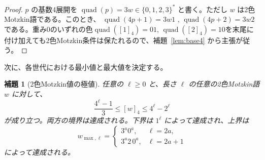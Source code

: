 \documentclass[12pt]{ltjsarticle}
\theoremstyle{plain}
\newtheorem{lemma}[theorem]{補題}
\theoremstyle{definition}
\theoremstyle{plain}
\begin{document}
\begin{proof}
$p$ の基数4展開を $\operatorname{quad}(p)=3w\in\{0,1,2,3\}^*$ と書く。ただし $w$ は2色Motzkin語である。このとき、 $\operatorname{quad}(4p+1)=3w1$ ,  $\operatorname{quad}(4p+2)=3w2$ である。重み0のいずれの色$\operatorname{quad}([1]_4)=01$, $\operatorname{quad}([2]_4)=10$を末尾に付け加えても2色Motzkin条件は保たれるので、補題~\ref{lem:base4} から主張が従う。
\end{proof}

次に、各世代における最小値と最大値を決定する。

\begin{lemma}[2色Motzkin値の極値]\label{lem:extremal}
任意の $\ell\geq0$ と、長さ $\ell$ の任意の2色Motzkin語 $w$ に対して、
\begin{equation}\label{eq:motzkin-extrema}
  \frac{4^{\ell}-1}{3}\leq[w]_4\leq4^{\ell}-2^{\ell}
\end{equation}
が成り立つ。両方の境界は達成される。下界は $1^{\ell}$ によって達成され、上界は
\[
  w_{\max,\ell}=
  \begin{cases}
    3^a0^a,&\ell=2a,\\
    3^a2\,0^a,&\ell=2a+1
  \end{cases}
\]
によって達成される。
\end{lemma}
\end{document}
